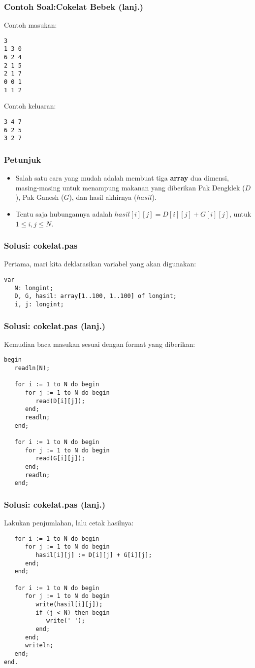 \documentclass{beamer}
\begin{document}
\begin{frame}[fragile]
\frametitle{Contoh Soal:\newline Cokelat Bebek (lanj.)}
Contoh masukan:
\begin{lstlisting}
3
1 3 0
6 2 4
2 1 5
2 1 7
0 0 1
1 1 2
\end{lstlisting}
Contoh keluaran:
\begin{lstlisting}
3 4 7
6 2 5
3 2 7
\end{lstlisting}
\end{frame}

\begin{frame}
\frametitle{Petunjuk}
\begin{itemize}
    \item Salah satu cara yang mudah adalah membuat tiga \textbf{array} dua dimensi, masing-masing untuk menampung makanan yang diberikan Pak Dengklek ($D$), Pak Ganesh ($G$), dan hasil akhirnya ($hasil$).
    \item Tentu saja hubungannya adalah $hasil[i][j] = D[i][j] + G[i][j]$, untuk $1 \le i,j \le N$.
\end{itemize}
\end{frame}

\begin{frame}[fragile]
\frametitle{Solusi: cokelat.pas}
Pertama, mari kita deklarasikan variabel yang akan digunakan:
\begin{lstlisting}
var
   N: longint;
   D, G, hasil: array[1..100, 1..100] of longint;
   i, j: longint;

\end{lstlisting}
\end{frame}

\begin{frame}[fragile]
\frametitle{Solusi: cokelat.pas (lanj.)}
Kemudian baca masukan sesuai dengan format yang diberikan:
\begin{lstlisting}
begin
   readln(N);

   for i := 1 to N do begin
      for j := 1 to N do begin
         read(D[i][j]);
      end;
      readln;
   end;

   for i := 1 to N do begin
      for j := 1 to N do begin
         read(G[i][j]);
      end;
      readln;
   end;
\end{lstlisting}
\end{frame}

\begin{frame}[fragile]
\frametitle{Solusi: cokelat.pas (lanj.)}
Lakukan penjumlahan, lalu cetak hasilnya:
\begin{lstlisting}
   for i := 1 to N do begin
      for j := 1 to N do begin
         hasil[i][j] := D[i][j] + G[i][j];
      end;
   end;

   for i := 1 to N do begin
      for j := 1 to N do begin
         write(hasil[i][j]);
         if (j < N) then begin
            write(' ');
         end;
      end;
      writeln;
   end;
end.
\end{lstlisting}
\end{frame}
\end{document}

